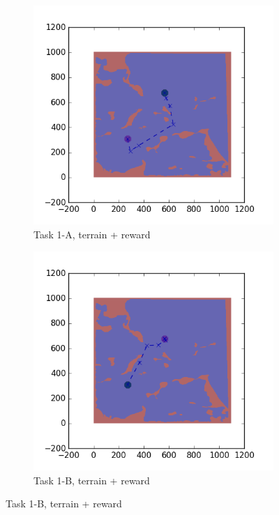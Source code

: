 \documentclass{tamuccthesis}
\begin{document}
\begin{figure}
    \begin{subfigure}[b]{0.4\textwidth}
        \centering
        \includegraphics[width=\textwidth,trim={3cm 3cm 3cm 3cm},clip]{EXP3RG_PathAa_-1_-1_0_-1.png}
        \caption[]{{\small Task 1-A, terrain + reward}}    
        \label{fig:Path_1-A_terrain_reward}
    \end{subfigure}
    \hfill
    \begin{subfigure}[b]{0.4\textwidth}  
        \centering 
        \includegraphics[width=\textwidth,trim={3cm 3cm 3cm 3cm},clip]{EXP3RG_PathAb_-1_-1_0_-1.png}
        \caption[]{{\small Task 1-B, terrain + reward}}   
        \label{fig:Path_1-B_terrain_reward}
    \end{subfigure}
   

\end{figure}
\end{document}
